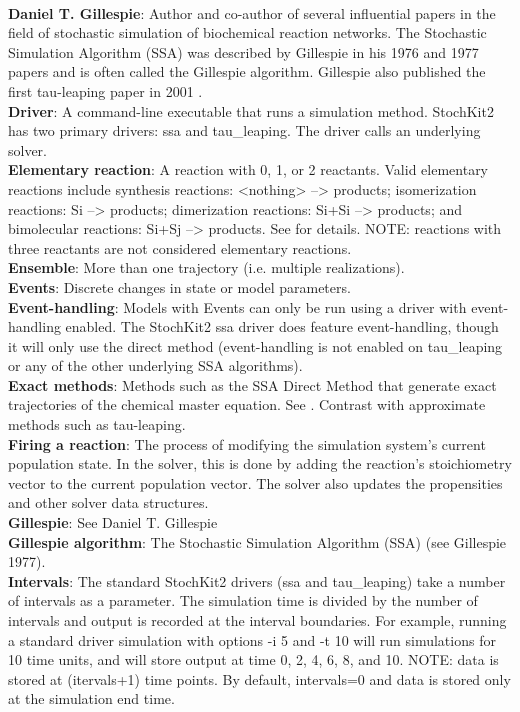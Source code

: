 \documentclass[11pt,letterpaper]{article}
\begin{document}
\begin{itemize}
\\\textbf{Daniel T. Gillespie}: Author and co-author of several influential papers in the field of stochastic simulation of biochemical reaction networks.  The Stochastic Simulation Algorithm (SSA) was described by Gillespie in his 1976 and 1977 papers and is often called the Gillespie algorithm.  Gillespie also published the first tau-leaping paper in 2001 \cite{Gillespie2001}.
\\\textbf{Driver}: A command-line executable that runs a simulation method.  StochKit2 has two primary drivers: ssa and tau\_leaping.  The driver calls an underlying solver.
\\\textbf{Elementary reaction}: A reaction with 0, 1, or 2 reactants.  Valid elementary reactions include synthesis reactions: <nothing> --> products; isomerization reactions: Si --> products; dimerization reactions: Si+Si --> products; and bimolecular reactions: Si+Sj --> products. See \cite{Gillespie1977} for details.  NOTE: reactions with three reactants are not considered elementary reactions. 
\\\textbf{Ensemble}: More than one trajectory (i.e. multiple realizations).
\\\textbf{Events}: Discrete changes in state or model parameters.
\\\textbf{Event-handling}: Models with Events can only be run using a driver with event-handling enabled.  The StochKit2 ssa driver does feature event-handling, though it will only use the direct method (event-handling is not enabled on tau\_leaping or any of the other underlying SSA algorithms).
\\\textbf{Exact methods}: Methods such as the SSA Direct Method that generate exact trajectories of the chemical master equation.  See \cite{Gillespie1977}.  Contrast with approximate methods such as tau-leaping.
\\\textbf{Firing a reaction}: The process of modifying the simulation system's current population state.  In the solver, this is done by adding the reaction's stoichiometry vector to the current population vector.  The solver also updates the propensities and other solver data structures.
\\\textbf{Gillespie}: See Daniel T. Gillespie
\\\textbf{Gillespie algorithm}: The Stochastic Simulation Algorithm (SSA) (see Gillespie 1977).  
\\\textbf{Intervals}: The standard StochKit2 drivers (ssa and tau\_leaping) take a number of intervals as a parameter.  The simulation time is divided by the number of intervals and output is recorded at the interval boundaries.  For example, running a standard driver simulation with options -i 5 and -t 10 will run simulations for 10 time units, and will store output at time 0, 2, 4, 6, 8, and 10.  NOTE: data is stored at (itervals+1) time points.  By default, intervals=0 and data is stored only at the simulation end time.

\end{itemize}
\end{document}
